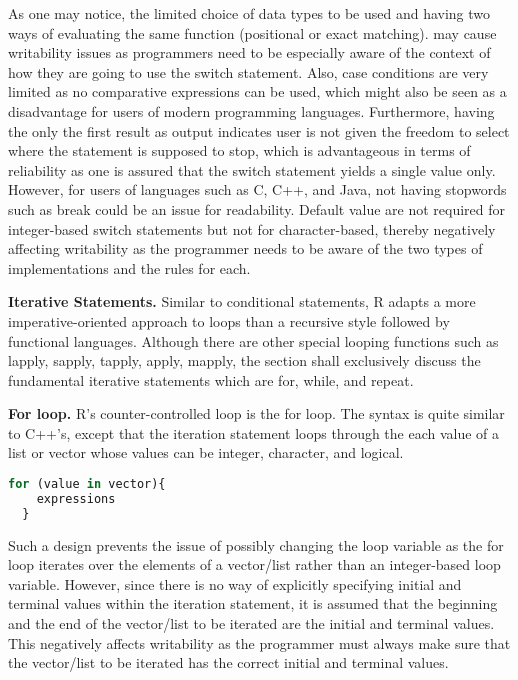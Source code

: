 \documentclass[12pt]{article}
\begin{document}
As one may notice, the limited choice of data types to be used and having two ways of evaluating the same function (positional or exact matching). may cause writability issues as programmers need to be especially aware of the context of how they are going to use the switch statement. Also, case conditions are very limited as no comparative expressions can be used, which might also be seen as a disadvantage for users of modern programming languages. Furthermore, having the only the first result as output indicates user is not given the freedom to select where the statement is supposed to stop, which is advantageous in terms of reliability as one is assured that the switch statement yields a single value only. However, for users of languages such as C, C++, and Java, not having stopwords such as break could be an issue for readability. Default value are not required for  integer-based switch statements but not for character-based, thereby negatively affecting writability as the programmer needs to be aware of the two types of implementations and the rules for each.

\textbf{Iterative Statements.} Similar to conditional statements, R adapts a more imperative-oriented approach to loops than a recursive style followed by functional languages. Although there are other special looping functions such as lapply, sapply, tapply, apply, mapply, the section shall exclusively discuss the fundamental iterative statements which are for, while, and repeat.

\textbf{For loop.} R's counter-controlled loop is the for loop. The syntax is quite similar to C++'s, except that the iteration statement loops through the each value of a list or vector whose values can be integer, character, and logical.

\begin{lstlisting}[language=R, frame=none]
  for (value in vector){
    expressions
  }
\end{lstlisting}

Such a design prevents the issue of possibly changing the loop variable as the for loop iterates over the elements of a vector/list rather than an integer-based loop variable. However, since there is no way of explicitly specifying initial and terminal values within the iteration statement, it is assumed that the beginning and the end of the vector/list to be iterated are the initial and terminal values. This negatively affects writability as the programmer must always make sure that the vector/list to be iterated has the correct initial and terminal values.
\end{document}
